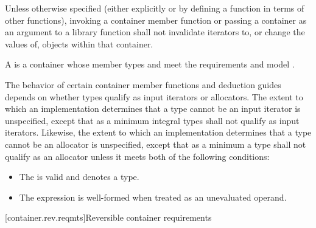 \pnum
Unless otherwise specified (either explicitly or by defining a
function in terms of other functions), invoking a container member
function or passing a container as an argument to a library function
shall not invalidate iterators to, or change the values of, objects
within that container.

\pnum
A 
is a container
whose member types  and 
meet the
 requirements and
model .

\pnum
The behavior of certain container member functions and deduction guides
depends on whether types qualify as input iterators or allocators.
The extent to which an implementation determines that a type cannot be an input
iterator is unspecified, except that as a minimum integral types shall not qualify
as input iterators.
Likewise, the extent to which an implementation determines that a type cannot be
an allocator is unspecified, except that as a minimum a type  shall not qualify
as an allocator unless it meets both of the following conditions:

\begin{itemize}
\item The  
is valid and denotes a type.

\item The expression 
is well-formed when treated as an unevaluated operand.
\end{itemize}

[container.rev.reqmts]{Reversible container requirements}

\renewcommand{\indexcont}[1]{%
\indexlibrarymisc{\idxcode{#1}}{reversible containers}%
\indexlibrarymemberx{array}{#1}%
\indexlibrarymemberx{deque}{#1}%
\indexlibrarymemberx{hive}{#1}%
\indexlibrarymemberx{list}{#1}%
\indexlibrarymemberx{vector}{#1}%
\indexlibrarymemberx{inplace_vector}{#1}%
\indexlibrarymemberx{map}{#1}%
\indexlibrarymemberx{set}{#1}%
\indexlibrarymemberx{multiset}{#1}%
\indexlibrarymemberx{multimap}{#1}%
\indexlibrarymemberx{unordered_map}{#1}%
\indexlibrarymemberx{unordered_set}{#1}%
\indexlibrarymemberx{unordered_multiset}{#1}%
\indexlibrarymemberx{unordered_multimap}{#1}%
\indexlibrarymemberx{flat_map}{#1}%
\indexlibrarymemberx{flat_set}{#1}%
\indexlibrarymemberx{flat_multiset}{#1}%
\indexlibrarymemberx{flat_multimap}{#1}%
}

